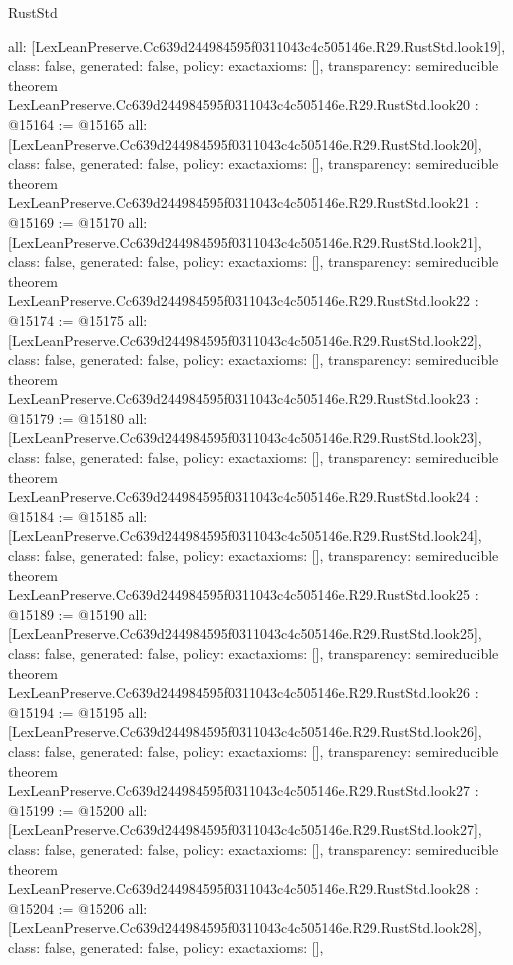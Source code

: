 \begin{lexlean}{RustStd}
\begin{coremodule}
{  all: [LexLeanPreserve.Cc639d244984595f0311043c4c505146e.R29.RustStd.look19],
  class: false,
  generated: false,
  policy: exact{axioms: []},
  transparency: semireducible
}
theorem LexLeanPreserve.Cc639d244984595f0311043c4c505146e.R29.RustStd.look20 : @15164 := @15165 {
  all: [LexLeanPreserve.Cc639d244984595f0311043c4c505146e.R29.RustStd.look20],
  class: false,
  generated: false,
  policy: exact{axioms: []},
  transparency: semireducible
}
theorem LexLeanPreserve.Cc639d244984595f0311043c4c505146e.R29.RustStd.look21 : @15169 := @15170 {
  all: [LexLeanPreserve.Cc639d244984595f0311043c4c505146e.R29.RustStd.look21],
  class: false,
  generated: false,
  policy: exact{axioms: []},
  transparency: semireducible
}
theorem LexLeanPreserve.Cc639d244984595f0311043c4c505146e.R29.RustStd.look22 : @15174 := @15175 {
  all: [LexLeanPreserve.Cc639d244984595f0311043c4c505146e.R29.RustStd.look22],
  class: false,
  generated: false,
  policy: exact{axioms: []},
  transparency: semireducible
}
theorem LexLeanPreserve.Cc639d244984595f0311043c4c505146e.R29.RustStd.look23 : @15179 := @15180 {
  all: [LexLeanPreserve.Cc639d244984595f0311043c4c505146e.R29.RustStd.look23],
  class: false,
  generated: false,
  policy: exact{axioms: []},
  transparency: semireducible
}
theorem LexLeanPreserve.Cc639d244984595f0311043c4c505146e.R29.RustStd.look24 : @15184 := @15185 {
  all: [LexLeanPreserve.Cc639d244984595f0311043c4c505146e.R29.RustStd.look24],
  class: false,
  generated: false,
  policy: exact{axioms: []},
  transparency: semireducible
}
theorem LexLeanPreserve.Cc639d244984595f0311043c4c505146e.R29.RustStd.look25 : @15189 := @15190 {
  all: [LexLeanPreserve.Cc639d244984595f0311043c4c505146e.R29.RustStd.look25],
  class: false,
  generated: false,
  policy: exact{axioms: []},
  transparency: semireducible
}
theorem LexLeanPreserve.Cc639d244984595f0311043c4c505146e.R29.RustStd.look26 : @15194 := @15195 {
  all: [LexLeanPreserve.Cc639d244984595f0311043c4c505146e.R29.RustStd.look26],
  class: false,
  generated: false,
  policy: exact{axioms: []},
  transparency: semireducible
}
theorem LexLeanPreserve.Cc639d244984595f0311043c4c505146e.R29.RustStd.look27 : @15199 := @15200 {
  all: [LexLeanPreserve.Cc639d244984595f0311043c4c505146e.R29.RustStd.look27],
  class: false,
  generated: false,
  policy: exact{axioms: []},
  transparency: semireducible
}
theorem LexLeanPreserve.Cc639d244984595f0311043c4c505146e.R29.RustStd.look28 : @15204 := @15206 {
  all: [LexLeanPreserve.Cc639d244984595f0311043c4c505146e.R29.RustStd.look28],
  class: false,
  generated: false,
  policy: exact{axioms: []},
}
\end{coremodule}
\end{lexlean}
